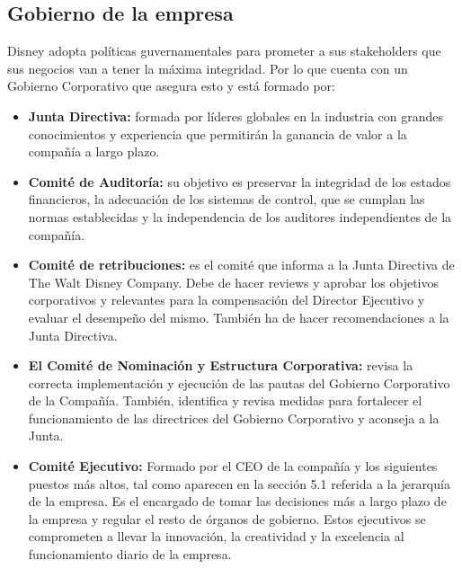 \subsection{Gobierno de la empresa}
Disney adopta políticas guvernamentales para prometer a sus stakeholders que sus negocios van a tener la máxima integridad. Por lo que cuenta con un Gobierno Corporativo que asegura esto y está formado por:

\begin{itemize}

\item
\textbf{Junta Directiva:} formada por líderes globales en la industria con grandes conocimientos y experiencia que permitirán la ganancia de valor a la compañía a largo plazo.

\item
\textbf{Comité de Auditoría:} su objetivo es preservar la integridad de los estados financieros, la adecuación de los sistemas de control, que se cumplan las normas establecidas y la independencia de los auditores independientes de la compañía.

\item
\textbf{Comité de retribuciones:} es el comité que informa a la Junta Directiva de The Walt Disney Company. Debe de hacer reviews y aprobar los objetivos corporativos y relevantes para la compensación del Director Ejecutivo y evaluar el desempeño del mismo. También ha de hacer recomendaciones a la Junta Directiva.

\item
\textbf{El Comité de Nominación y Estructura Corporativa:} revisa la correcta implementación y ejecución de las pautas del Gobierno Corporativo de la Compañía. También, identifica y revisa medidas para fortalecer el funcionamiento de las directrices del Gobierno Corporativo y aconseja a la Junta.

\item
\textbf{Comité Ejecutivo:} Formado por el CEO de la compañía y los siguientes puestos más altos, tal como aparecen en la sección 5.1 referida a la jerarquía de la empresa. Es el encargado de tomar las decisiones más a largo plazo de la empresa y regular el resto de órganos de gobierno. Estos ejecutivos se comprometen a llevar la innovación, la creatividad y la excelencia al funcionamiento diario de la empresa.

\end{itemize}